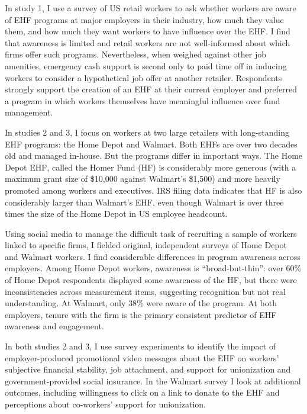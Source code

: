 \documentclass[
  11pt,
  oneside]{article}
\begin{document}
In study 1, I use a survey of US retail workers to ask whether workers are aware of EHF programs at major employers in their industry, how much they value them, and how much they want workers to have influence over the EHF. I find that awareness is limited and retail workers are not well-informed about which firms offer such programs. Nevertheless, when weighed against other job amenities, emergency cash support is second only to paid time off in inducing workers to consider a hypothetical job offer at another retailer. Respondents strongly support the creation of an EHF at their current employer and preferred a program in which workers themselves have meaningful influence over fund management.

In studies 2 and 3, I focus on workers at two large retailers with long-standing EHF programs: the Home Depot and Walmart. Both EHFs are over two decades old and managed in-house. But the programs differ in important ways. The Home Depot EHF, called the Homer Fund (HF) is considerably more generous (with a maximum grant size of \$10,000 against Walmart's \$1,500) and more heavily promoted among workers and executives. IRS filing data indicates that HF is also considerably larger than Walmart's EHF, even though Walmart is over three times the size of the Home Depot in US employee headcount.

Using social media to manage the difficult task of recruiting a sample of workers linked to specific firms, I fielded original, independent surveys of Home Depot and Walmart workers. I find considerable differences in program awareness across employers. Among Home Depot workers, awareness is ``broad-but-thin'': over 60\% of Home Depot respondents displayed some awareness of the HF, but there were inconsistencies across measurement items, suggesting recognition but not real understanding. At Walmart, only 38\% were aware of the program. At both employers, tenure with the firm is the primary consistent predictor of EHF awareness and engagement.

In both studies 2 and 3, I use survey experiments to identify the impact of employer-produced promotional video messages about the EHF on workers' subjective financial stability, job attachment, and support for unionization and government-provided social insurance. In the Walmart survey I look at additional outcomes, including willingness to click on a link to donate to the EHF and perceptions about co-workers' support for unionization.
\end{document}
